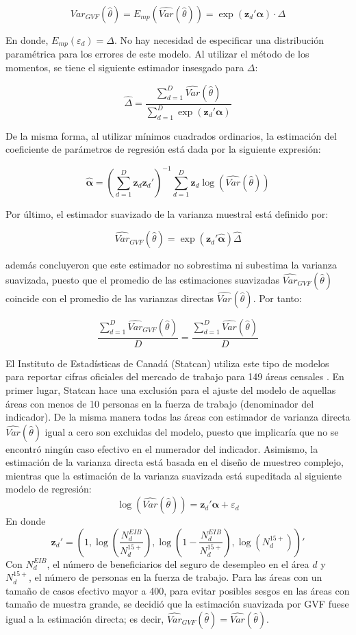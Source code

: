 \documentclass[
  12pt,
]{book}
\begin{document}
\[
Var_{GVF}(\hat{\theta})  = E_{mp}(\widehat{Var}(\hat{\theta})) = \exp(\mathbf z_d' \boldsymbol \alpha) \cdot \Delta
\]

En donde, \(E_{mp}(\varepsilon_d) = \Delta\). No hay necesidad de especificar una distribución paramétrica para los errores de este modelo. Al utilizar el método de los momentos, se tiene el siguiente estimador insesgado para \(\Delta\):

\[
\hat\Delta = \frac{\sum_{d=1}^D \widehat{Var}(\hat{\theta})}{\sum_{d=1}^D \exp(\mathbf z_d' \boldsymbol \alpha)}
\]

De la misma forma, al utilizar mínimos cuadrados ordinarios, la estimación del coeficiente de parámetros de regresión está dada por la siguiente expresión:

\[
\hat{\boldsymbol \alpha} = \left(\sum_{d=1}^D \mathbf z_d \mathbf z_d' \right)^{-1} \sum_{d=1}^D \mathbf z_d \log(\widehat{Var}(\hat{\theta}))
\]

Por último, el estimador suavizado de la varianza muestral está definido por:

\[
\widehat{Var}_{GVF}(\hat{\theta}) = \exp(\mathbf z_d'\hat{\boldsymbol \alpha})\hat\Delta 
\]

\citet{Rivest_Belmonte_2000} además concluyeron que este estimador no sobrestima ni subestima la varianza suavizada, puesto que el promedio de las estimaciones suavizadas \(\widehat{Var}_{GVF}(\hat{\theta})\) coincide con el promedio de las varianzas directas \(\widehat{{Var}}(\hat{\theta})\). Por tanto:

\[
\frac{\sum_{d=1}^D \widehat{Var}_{GVF}(\hat{\theta}) }{D} = \frac{\sum_{d=1}^D \widehat{{Var}}(\hat{\theta})}{D}
\]

El Instituto de Estadísticas de Canadá (Statcan) utiliza este tipo de modelos para reportar cifras oficiales del mercado de trabajo para 149 áreas censales \citep{statcan2016}. En primer lugar, Statcan hace una exclusión para el ajuste del modelo de aquellas áreas con menos de 10 personas en la fuerza de trabajo (denominador del indicador). De la misma manera todas las áreas con estimador de varianza directa \(\widehat{{Var}}(\hat{\theta})\) igual a cero son excluidas del modelo, puesto que implicaría que no se encontró ningún caso efectivo en el numerador del indicador. Asimismo, la estimación de la varianza directa está basada en el diseño de muestreo complejo, mientras que la estimación de la varianza suavizada está supeditada al siguiente modelo de regresión:
\[
\log(\widehat{Var}(\hat{\theta})) = \mathbf z_d' \boldsymbol \alpha + \varepsilon_d
\]
En donde
\[
\mathbf z_d'=\left(1, \log\left(\frac{N_d^{EIB}}{N_d^{15+}}\right),
\log\left(1-\frac{N_d^{EIB}}{N_d^{15+}}\right),
\log\left(N_d^{15+}\right)\right)'
\]
Con \(N_d^{EIB}\), el número de beneficiarios del seguro de desempleo en el área \(d\) y \(N_d^{15+}\), el número de personas en la fuerza de trabajo. Para las áreas con un tamaño de casos efectivo mayor a 400, para evitar posibles sesgos en las áreas con tamaño de muestra grande, se decidió que la estimación suavizada por GVF fuese igual a la estimación directa; es decir, \(\widehat{Var}_{GVF}(\hat{\theta}) = \widehat{Var}(\hat{\theta})\).
\end{document}
